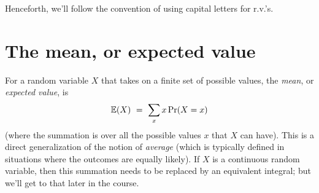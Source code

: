 \documentclass{report}
\theoremstyle{plain}
\theoremstyle{definition}
\newcommand{\E}{\mathbb{E}}
\newcommand{\pr}{\mbox{\rm Pr}}
\begin{document}
Henceforth, we'll follow the convention of using capital letters for r.v.'s.

\section{The mean, or expected value}

For a random variable $X$ that takes on a finite set of possible values, the 
{\it mean}, or {\it expected value}, is
$$ \E(X) \ = \ \sum_{x} x \, \pr(X = x) $$
(where the summation is over all the possible values $x$ that $X$ can have). This
is a direct generalization of the notion of {\it average} (which is typically
defined in situations where the outcomes are equally likely). If $X$ is a continuous 
random variable, then this summation needs to be replaced by an equivalent integral; 
but we'll get to that later in the course.
\end{document}
